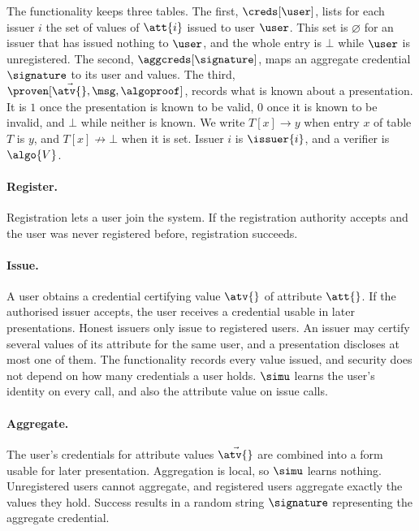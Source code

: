 The functionality keeps three tables. The first, $\creds[\user]$, lists for
each issuer $i$ the set of values of $\att{i}$ issued to user $\user$. This set
is $\varnothing$ for an issuer that has issued nothing to $\user$, and the whole
entry is $\bot$ while $\user$ is unregistered. The second,
$\aggcreds[\signature]$, maps an aggregate credential $\signature$ to its user
and values. The third, $\proven[\vec{\atv{}}, \msg, \algoproof]$, records what
is known about a presentation. It is $1$ once the presentation is known to be
valid, $0$ once it is known to be invalid, and $\bot$ while neither is known. We
write $T[x] \rightarrow y$ when entry $x$ of table $T$ is $y$, and $T[x]
\not\rightarrow \bot$ when it is set. Issuer $i$ is $\issuer{i}$, and a verifier
is $\algo{V}$.

\paragraph{Register.} Registration lets a user join the system. If the
registration authority accepts and the user was never registered before,
registration succeeds.

\paragraph{Issue.} A user obtains a credential certifying value $\atv{}$ of
attribute $\att{}$. If the authorised issuer accepts, the user
receives a credential usable in later presentations. Honest issuers only
issue to registered users. An issuer may certify several values of its attribute
for the same user, and a presentation discloses at most one of them. The
functionality records every value issued, and security does not depend on how
many credentials a user holds. $\simu$ learns the user's identity on
every call, and also the attribute value on issue calls.

\paragraph{Aggregate.} The user's credentials for attribute values
$\vec{\atv{}}$ are combined into a form usable for later presentation.
Aggregation is local, so $\simu$ learns nothing. Unregistered users cannot
aggregate, and registered users aggregate exactly the values they hold. Success
results in a random string $\signature$ representing the aggregate credential.

